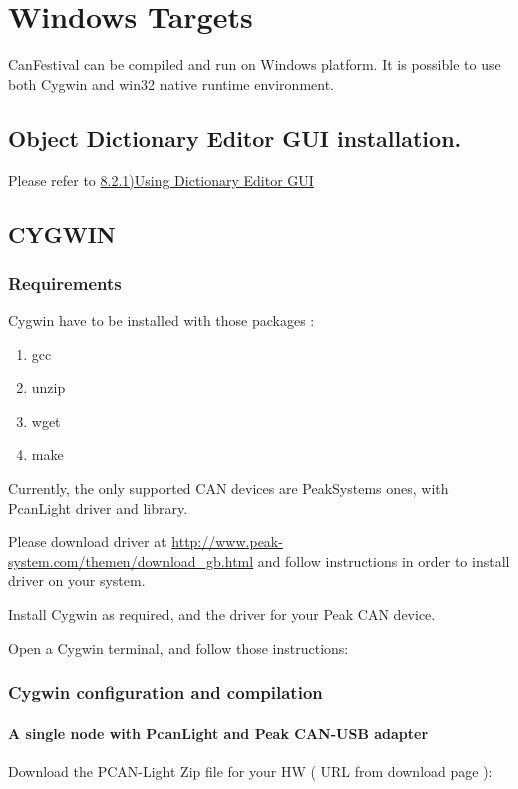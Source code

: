 \documentclass[a4paper,12pt]{book}
\newcommand\liststyleLix{%
\renewcommand\labelitemi{{--}}
\renewcommand\labelitemii{{--}}
\renewcommand\labelitemiii{{--}}
\renewcommand\labelitemiv{{--}}
}
\begin{document}
\section{Windows Targets}
CanFestival can be compiled and run on Windows platform. It is possible
to use both Cygwin and win32 native runtime environment.

\subsection{Object Dictionary Editor GUI installation.}
Please refer to
\hyperlink{a821UsingDictionaryEditorGUIoutline}{8.2.1)Using Dictionary
Editor GUI}

\subsection{CYGWIN}
\subsubsection{Requirements}
Cygwin have to be installed with those packages :

\liststyleLix
\begin{enumerate}
\item gcc
\item unzip
\item wget
\item make
\end{enumerate}
Currently, the only supported CAN devices are PeakSystems ones, with
PcanLight driver and library. 

Please download driver at
\href{http://www.peak-system.com/themen/download_gb.html}{http://www.peak{}-system.com/themen/download\_gb.html}
\space and follow instructions in order to install driver on your system.

Install Cygwin as required, and the driver for your Peak CAN device.

Open a Cygwin terminal, and follow those instructions:

\subsubsection{Cygwin configuration and compilation}
\paragraph{A single node with PcanLight and Peak CAN{}-USB adapter}
Download the PCAN{}-Light Zip file for your HW ( URL from download page
): 
\end{document}
